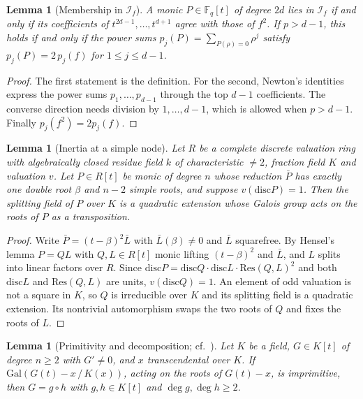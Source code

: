 \documentclass[11pt,a4paper]{article}
\newtheorem{lemma}[theorem]{Lemma}
\theoremstyle{definition}
\theoremstyle{remark}
\newcommand{\Fq}{\mathbb{F}_q}
\newcommand{\Gal}{\mathrm{Gal}}
\newcommand{\disc}{\mathrm{disc}}
\newcommand{\cI}{\mathcal{I}}
\begin{document}
\begin{lemma}[Membership in $\cI_f$]\label{lem:membership}
A monic $P\in\Fq[t]$ of degree $2d$ lies in $\cI_f$ if and only if its
coefficients of $t^{2d-1},\dots,t^{d+1}$ agree with those of $f^2$.
If $p>d-1$, this holds if and only if the power sums
$p_j(P)=\sum_{P(\rho)=0}\rho^j$ satisfy $p_j(P)=2\,p_j(f)$ for $1\le j\le d-1$.
\end{lemma}

\begin{proof}
The first statement is the definition. For the second, Newton's identities
express the power sums $p_1,\dots,p_{d-1}$ through the top $d-1$ coefficients.
The converse direction needs division by $1,\dots,d-1$, which is allowed when $p>d-1$.
Finally $p_j(f^2)=2p_j(f)$.
\end{proof}

\begin{lemma}[Inertia at a simple node]\label{lem:node}
Let $R$ be a complete discrete valuation ring with algebraically closed residue
field $k$ of characteristic $\ne2$, fraction field $K$ and valuation $v$.
Let $P\in R[t]$ be monic of degree $n$ whose reduction $\bar P$ has exactly
one double root $\beta$ and $n-2$ simple roots, and suppose $v(\disc P)=1$.
Then the splitting field of $P$ over $K$ is a quadratic extension whose
Galois group acts on the roots of $P$ as a transposition.
\end{lemma}

\begin{proof}
Write $\bar P=(t-\beta)^2\bar L$ with $\bar L(\beta)\neq0$ and $\bar L$ squarefree.
By Hensel's lemma $P=QL$ with $Q,L\in R[t]$ monic lifting $(t-\beta)^2$ and $\bar L$,
and $L$ splits into linear factors over $R$.
Since $\disc P=\disc Q\cdot\disc L\cdot\mathrm{Res}(Q,L)^2$ and both
$\disc L$ and $\mathrm{Res}(Q,L)$ are units, $v(\disc Q)=1$.
An element of odd valuation is not a square in $K$, so $Q$ is irreducible over
$K$ and its splitting field is a quadratic extension. Its nontrivial automorphism
swaps the two roots of $Q$ and fixes the roots of $L$.
\end{proof}

\begin{lemma}[Primitivity and decomposition; cf.\ \cite{Turnwald1995,Muller1995}]\label{lem:luroth}
Let $K$ be a field, $G\in K[t]$ of degree $n\ge2$ with $G'\neq0$, and $x$
transcendental over $K$. If $\Gal(G(t)-x\,/\,K(x))$, acting on the roots of $G(t)-x$,
is imprimitive, then $G=g\circ h$ with $g,h\in K[t]$ and $\deg g,\deg h\ge2$.
\end{lemma}
\end{document}
